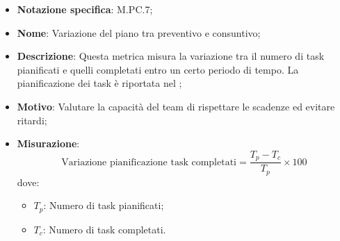 \begin{itemize}
    \item \textbf{Notazione specifica}: M.PC.7;
    \item \textbf{Nome}: Variazione del piano tra preventivo e consuntivo;
    \item \textbf{Descrizione}: Questa metrica misura la variazione tra il numero di task pianificati e quelli completati entro un certo periodo di tempo. La pianificazione dei task è riportata nel \VersionePP;
    \item \textbf{Motivo}: Valutare la capacità del team di rispettare le scadenze ed evitare ritardi;
    \item \textbf{Misurazione}:
    \[
        \text{Variazione pianificazione task completati} = \frac{T_p - T_c}{T_p} \times 100
    \]
    dove:
    \begin{itemize}
        \item $T_{p}$: Numero di task pianificati;
        \item $T_{c}$: Numero di task completati.
    \end{itemize}
\end{itemize}
